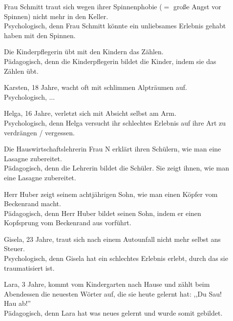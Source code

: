 \documentclass[12pt,a4paper]{article}
\begin{document}
\begin{description}
\item[\desccount] Frau Schmitt traut sich wegen ihrer Spinnenphobie ($=$ große
  Angst vor Spinnen) nicht mehr in den Keller. \\
  {\color{english} {Psychologisch}}, denn Frau Schmitt könnte ein unliebsames
  Erlebnis gehabt haben mit den Spinnen.

\item[\desccount] Die Kinderpflegerin übt mit den Kindern das Zählen. \\
  {\color{red} {Pädagogisch}}, denn die Kinderpflegerin bildet die Kinder, indem
  sie das Zählen übt.

\item[\desccount] Karsten, 18 Jahre, wacht oft mit schlimmen Alpträumen auf. \\
  {\color{english} {Psychologisch}}, $\ldots$

\item[\desccount] Helga, 16 Jahre, verletzt sich mit Absicht selbst am Arm. \\
  {\color{english} {Psychologisch}}, denn Helga versucht ihr schlechtes Erlebnis
  auf ihre Art zu verdrängen / vergessen.

\item[\desccount] Die Hauswirtschaftslehrerin Frau N erklärt ihren Schülern, wie
  man eine Lasagne zubereitet. \\
  {\color{red} {Pädagogisch}}, denn die Lehrerin bildet die Schüler. Sie zeigt
  ihnen, wie man eine Lasagne zubereitet.

\item[\desccount] Herr Huber zeigt seinem achtjährigen Sohn, wie man einen
  Köpfer vom Beckenrand macht. \\
  {\color{red} {Pädagogisch}}, denn Herr Huber bildet seinen Sohn, indem er
  einen Kopfsprung vom Beckenrand aus vorführt.

\item[\desccount] Gisela, 23 Jahre, traut sich nach einem Autounfall nicht
  mehr selbst ans Steuer. \\
  {\color{english} {Psychologisch}}, denn Gisela hat ein schlechtes Erlebnis
  erlebt, durch das sie traumatisiert ist.

\item[\desccount] Lara, 3 Jahre, kommt vom Kindergarten nach Hause und zählt
  beim Abendessen die neuesten Wörter auf, die sie heute gelernt hat: ,,Du Sau!
  Hau ab!'' \\
  {\color{red} {Pädagogisch}}, denn Lara hat was neues gelernt und wurde somit
  gebildet.
  
\end{description}
\end{document}
